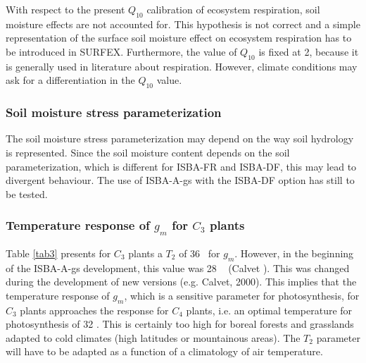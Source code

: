 {With respect to the present $Q_{10}$ calibration of ecosystem respiration, soil moisture effects are not
accounted for. This hypothesis is not correct and a simple representation of the surface soil moisture
effect on ecosystem respiration has to be introduced in SURFEX. Furthermore, the value of $Q_{10}$ is
fixed at 2, because it is generally used in literature about respiration. However, climate conditions may
ask for a differentiation in the $Q_{10}$ value.

\subsubsection{Soil moisture stress parameterization}

The soil moisture stress parameterization may depend on the way soil hydrology is represented. Since
the soil moisture content depends on the soil parameterization, which is different for ISBA-FR and
ISBA-DF, this may lead to divergent behaviour. The use of ISBA-A-gs with the ISBA-DF option has still
to be tested.

\subsubsection{Temperature response of $g_{m}$ for $C_{3}$  plants}
\label{sec3.3}

Table \ref{tab3} presents for $C_{3}$ plants a $T_{2}$ of 36 \textcelsius ~for $g_{m}$. However, in the beginning of the ISBA-A-gs
development, this value was 28 \textcelsius ~  (Calvet ). This was changed during the development of
new versions (e.g. Calvet, 2000). This implies that the temperature response of $g_{m}$, which is a sensitive
parameter for photosynthesis, for $C_{3}$ plants approaches the response for $C_{4}$ plants, i.e. an optimal
temperature for photosynthesis of 32 \textcelsius . This is certainly too high for boreal forests and grasslands
adapted to cold climates (high latitudes or mountainous areas). The $T_{2}$ parameter will have to be
adapted as a function of a climatology of air temperature.

}
